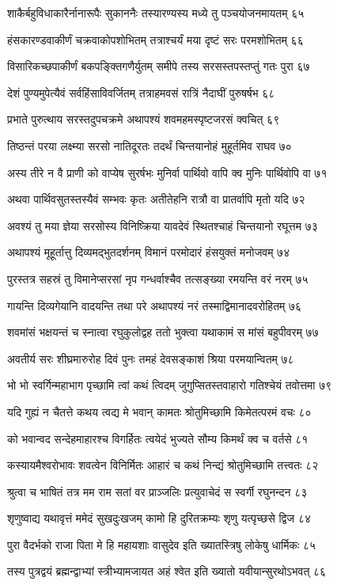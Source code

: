 शाकैर्बहुविधाकारैर्नानारूपैः सुकाननैः
तस्यारण्यस्य मध्ये तु पञ्चयोजनमायतम् ६५

हंसकारण्डवाकीर्णं चक्रवाकोपशोभितम्
तत्राश्चर्यं मया दृष्टं सरः परमशोभितम् ६६

विसारिकच्छपाकीर्णं बकपङ्क्तिगणैर्युतम्
समीपे तस्य सरसस्तपस्तप्तुं गतः पुरा ६७

देशं पुण्यमुपेत्यैवं सर्वहिंसाविवर्जितम्
तत्राहमवसं रात्रिं नैदाघीं पुरुषर्षभ ६८

प्रभाते पुरुत्थाय सरस्तदुपचक्रमे
अथापश्यं शवमहमस्पृष्टजरसं क्वचित् ६९

तिष्ठन्तं परया लक्ष्म्या सरसो नातिदूरतः
तदर्थं चिन्तयानोहं मुहूर्तमिव राघव ७०

अस्य तीरे न वै प्राणी को वाप्येष सुरर्षभः
मुनिर्वा पार्थिवो वापि क्व मुनिः पार्थिवोपि वा ७१

अथवा पार्थिवसुतस्तस्यैवं सम्भवः कृतः
अतीतेहनि रात्रौ वा प्रातर्वापि मृतो यदि ७२

अवश्यं तु मया ज्ञेया सरसोस्य विनिष्क्रिया
यावदेवं स्थितश्चाहं चिन्तयानो रघूत्तम ७३

अथापश्यं मूहूर्तात्तु दिव्यमद्भुतदर्शनम्
विमानं परमोदारं हंसयुक्तं मनोजवम् ७४

पुरस्तत्र सहस्रं तु विमानेप्सरसां नृप
गन्धर्वाश्चैव तत्सङ्ख्या रमयन्ति वरं नरम् ७५

गायन्ति दिव्यगेयानि वादयन्ति तथा परे
अथापश्यं नरं तस्माद्विमानादवरोहितम् ७६

शवमांसं भक्षयन्तं च स्नात्वा रघुकुलोद्वह
ततो भुक्त्वा यथाकामं स मांसं बहुपीवरम् ७७

अवतीर्य सरः शीघ्रमारुरोह दिवं पुनः
तमहं देवसङ्काशं श्रिया परमयान्वितम् ७८

भो भो स्वर्गिन्महाभाग पृच्छामि त्वां कथं त्विदम्
जुगुप्सितस्तवाहारो गतिश्चेयं तवोत्तमा ७९

यदि गुह्यं न चैतत्ते कथय त्वद्य मे भवान्
कामतः श्रोतुमिच्छामि किमेतत्परमं वचः ८०

को भवान्वद सन्देहमाहारश्च विगर्हितः
त्वयेदं भुज्यते सौम्य किमर्थं क्व च वर्तसे ८१

कस्यायमैश्वरोभावः शवत्वेन विनिर्मितः
आहारं च कथं निन्द्यं श्रोतुमिच्छामि तत्त्वतः ८२

श्रुत्वा च भाषितं तत्र मम राम सतां वर
प्राञ्जलिः प्रत्युवाचेदं स स्वर्गी रघुनन्दन ८३

शृणुष्वाद्य यथावृत्तं ममेदं सुखदुःखजम्
कामो हि दुरितक्रम्यः शृणु यत्पृच्छसे द्विज ८४

पुरा वैदर्भको राजा पिता मे हि महायशाः
वासुदेव इति ख्यातस्त्रिषु लोकेषु धार्मिकः ८५

तस्य पुत्रद्वयं ब्रह्मन्द्वाभ्यां स्त्रीभ्यामजायत
अहं श्वेत इति ख्यातो यवीयान्सुरथोऽभवत् ८६


